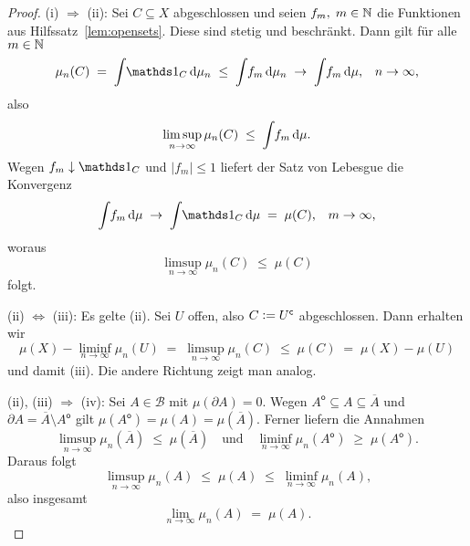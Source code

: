 \documentclass[../main/main.tex]{subfiles}
\begin{document}
	\begin{proof}
		(i) $\Rightarrow$ (ii): Sei $C \subseteq X$ abgeschlossen und seien 
		$f_m, \; m \in \mathbb{N}$ die Funktionen aus Hilfssatz~\ref{lem:opensets}. 
		Diese sind stetig und beschränkt.
		Dann gilt für alle $m \in \mathbb{N}$
		$$\mu_n(C) \; = \; \measureint{}{\indfct_C}{\mu_n} \; \leq \; 
			\measureint{}{f_m}{\mu_n} \; \to \;
			\measureint{}{f_m}{\mu} \text{,} \quad n \to \infty \text{,}$$
		also 
		$$\limsup_{n \to \infty} \mu_n(C) \; \leq \; 
			\int_{} \, f_m \, \mathrm{d}\mu \text{.}$$
		Wegen $f_m \convdown \indfct_C$ und $| f_m | \leq 1$ 
		liefert der Satz von Lebesgue die Konvergenz
		$$\measureint{}{f_m}{\mu} \; \to \;
			\measureint{}{\indfct_C}{\mu} \; = \; \mu(C) \text{,} \quad m \to \infty \text{,}$$
		woraus
		$$\limsup_{n \to \infty} \mu_n(C) \; \leq \; \mu(C)$$
		folgt.
		
		(ii) $\Leftrightarrow$ (iii): Es gelte (ii). Sei $U$ offen, also 
		$C \vcentcolon = U^\mathsf{c}$ abgeschlossen. Dann erhalten wir
		$$\mu(X) - \liminf_{n \to \infty} \mu_n(U) \; = \; 
			\limsup_{n \to \infty} \mu_n(C) \; \leq \; 
			\mu(C) \; = \; \mu(X) - \mu(U)$$
		und damit (iii). Die andere Richtung zeigt man analog.
		
		(ii), (iii) $\Rightarrow$ (iv): Sei $A \in \mathcal{B}$ mit 
		$\mu(\partial A) = 0$. Wegen
		$A^\mathsf{o} \subseteq A \subseteq \overline{A}$ und 
			$\partial A = \overline{A} \setminus A^\mathsf{o}$ gilt $\mu(A^\mathsf{o}) = 
			\mu(A) = \mu(\overline{A}) \text{.}$
		Ferner liefern die Annahmen
		$$\limsup_{n \to \infty} \mu_n(\overline{A}) \; \leq \; 
			\mu(\overline{A}) \quad \text{und} \quad 
			\liminf_{n \to \infty} \mu_n(A^\mathsf{o}) \; \geq \; 
			\mu(A^\mathsf{o}) \text{.}$$
		Daraus folgt
		$$\limsup_{n \to \infty} \mu_n(A) \; \leq \; 
		\mu(A) \; \leq \; \liminf_{n \to \infty} \mu_n(A) \text{,}$$
		also insgesamt
		$$\lim_{n \to \infty} \mu_n(A) \; = \; \mu(A) \text{.}$$
		

\end{proof}
\end{document}
